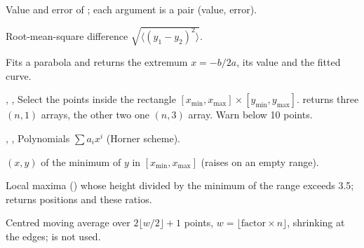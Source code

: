 \documentclass[11pt,a4paper]{article}
\begin{document}
 
Value and error of ; each argument is a pair (value, error).


Root-mean-square difference $\sqrt{\langle(y_1-y_2)^2\rangle}$.

Fits a parabola and returns the extremum $x=-b/2a$, its value and the
fitted curve.

, ,  
Select the points inside the rectangle $[x_\mathrm{min},x_\mathrm{max}]\times[y_\mathrm{min},y_\mathrm{max}]$.
 returns three $(n,1)$ arrays, the other two one
$(n,3)$ array. Warn below 10 points.

, , 
Polynomials $\sum a_i x^i$ (Horner scheme).

$(x, y)$ of the minimum of $y$ in $[x_\mathrm{min}, x_\mathrm{max}]$ (raises
on an empty range).

Local maxima () whose height divided by the
minimum of the range exceeds 3.5; returns positions and these ratios.
\legacy

Centred moving average over $2\lfloor w/2\rfloor+1$ points,
$w = \lfloor\text{factor}\times n\rfloor$, shrinking at the edges; 
is not used.


\end{document}

